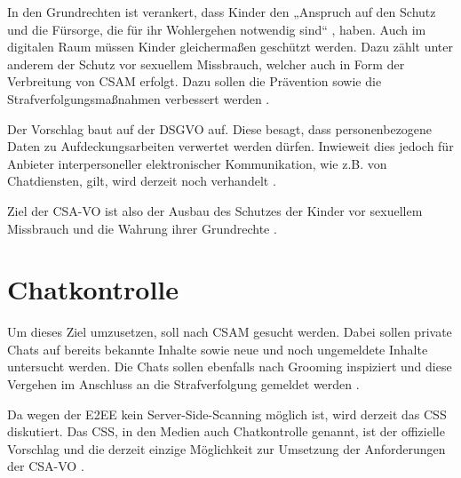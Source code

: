 In den Grundrechten ist verankert, dass Kinder den „Anspruch auf den Schutz und die Fürsorge, die für ihr Wohlergehen notwendig sind“ \cite{eu_charta_der_grundrechte}, haben. Auch im digitalen Raum müssen Kinder gleichermaßen geschützt werden. Dazu zählt unter anderem der Schutz vor sexuellem Missbrauch, welcher auch in Form der Verbreitung von \ac{CSAM} erfolgt. Dazu sollen die Prävention sowie die Strafverfolgungsmaßnahmen verbessert werden \cite{csa_verordnung}.

Der Vorschlag baut auf der \ac{DSGVO} auf. Diese besagt, dass personenbezogene Daten zu Aufdeckungsarbeiten verwertet werden dürfen. Inwieweit dies jedoch für Anbieter interpersoneller elektronischer Kommunikation, wie z.B. von Chatdiensten, gilt, wird derzeit noch verhandelt \cite{csa_verordnung}.

Ziel der \ac{CSA-VO} ist also der Ausbau des Schutzes der Kinder vor sexuellem Missbrauch und die Wahrung ihrer Grundrechte \cite{csa_verordnung}.

\section{Chatkontrolle} %
\label{sec:CSA:Umsetzung}
Um dieses Ziel umzusetzen, soll nach \ac{CSAM} gesucht werden. Dabei sollen private Chats auf bereits bekannte Inhalte sowie neue und noch ungemeldete Inhalte untersucht werden. Die Chats sollen ebenfalls nach Grooming inspiziert und diese Vergehen im Anschluss an die Strafverfolgung gemeldet werden \cite{csa_verordnung}.


Da wegen der \ac{E2EE} kein Server-Side-Scanning möglich ist, wird derzeit das \ac{CSS} diskutiert. Das \ac{CSS}, in den Medien auch \glqq Chatkontrolle\grqq{} \cite{csa_verordnung} genannt, ist der offizielle Vorschlag und die derzeit einzige Möglichkeit zur Umsetzung der Anforderungen der \ac{CSA-VO} \cite{abelson:2024}.

